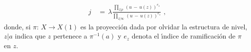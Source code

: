 \begin{align*}
 j & \,=\,\lambda
 \frac{\prod_{z|\rho}\,(u\,-\,u(z))^{e_{z}}}%
 {\prod_{z|\infty}\,(u\,-\,u(z))^{e_{z}}}\text{ ,}
\end{align*}
donde, si $\pi:\,X\rightarrow X(1)$ es la proyecci\'{o}n dada por olvidar la
estructura de nivel, $z| a$ indica que $z$ pertenece a $\pi^{-1}(a)$ y $e_{z}$
denota el \'{\i}ndice de ramificaci\'{o}n de $\pi$ en $z$. \cite{chenLevelFive}

%
%
%
